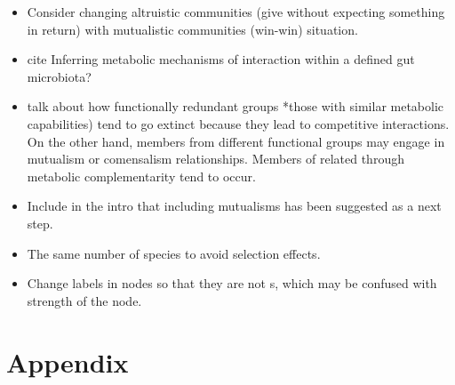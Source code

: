 \documentclass[titlepage,11pt]{article}
\begin{document}
\begin{linenumbers}
\begin{singlespace}
\begin{itemize}
	\item Consider changing altruistic communities (give without expecting something in return) with mutualistic communities (win-win) situation.
	\item cite Inferring metabolic mechanisms of interaction within a defined gut microbiota?
	\item talk about how functionally redundant groups *those with similar metabolic capabilities) tend to go extinct because they lead to competitive interactions. On the other hand, members from different functional groups may engage in mutualism or comensalism relationships. Members of related through metabolic complementarity tend to occur.
	\item Include in the intro that including mutualisms has been suggested as a next step.
	\item The same number of species to avoid selection effects.
	\item Change labels in nodes so that they are not s, which may be confused with strength of the node.
	
	
\end{itemize}
\newpage
\section{Appendix}

\end{singlespace}
\end{linenumbers}
\end{document}
